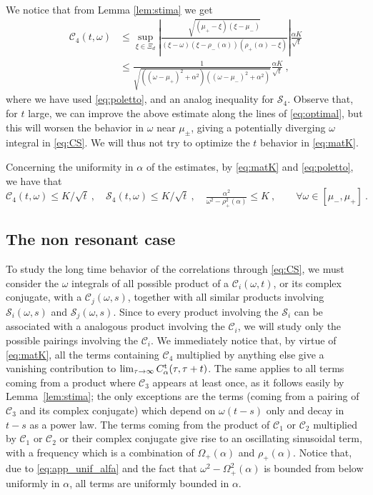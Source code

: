 \documentclass[11pt]{article}
\numberwithin{equation}{section}
\numberwithin{theorem}{section}
\newcommand{\matC}{{\mathscr C}}
\newcommand{\matS}{{\mathscr S}}
\newcommand{\x}{\xi}
\begin{document}
We notice that from Lemma \ref{lem:stima} we get
\begin{equation}\label{eq:matK}
  \begin{split}
\matC_4(t,\omega)&\leq\sup_{\xi\in\Xi_d}\left|\frac{\sqrt{(\mu_+-\xi)(\x-\mu_-)}}
{(\xi-\omega)(\xi-\rho_-(\alpha))(\rho_+(\alpha)-\xi)}\right|\frac{\alpha
  K}{\sqrt{t}}\\
&\leq \frac {1} 
{\sqrt{((\omega-\mu_+)^2+\alpha^2)((\omega-\mu_-)^2+\alpha^2)}}\frac{\alpha
  K}{\sqrt{t}}\ ,
\end{split}
\end{equation}
where we have
used \eqref{eq:poletto}, and an analog inequality for $\matS_4$.  Observe that, for $t$ large, we can improve the above estimate along the lines of
\eqref{eq:optimal}, but this will worsen the behavior in $\omega$ near $\mu_\pm$, giving a potentially diverging $\omega$ integral  
in \eqref{eq:CS}. We will thus not try to optimize the $t$ behavior in \eqref{eq:matK}.

Concerning the uniformity in $\alpha$ of the estimates, by \eqref{eq:matK} and
\eqref{eq:poletto}, we have that
\begin{equation}\label{eq:app_unif_alfa}
\matC_4(t,\omega)\le K/\sqrt{t}\ ,\quad \matS_4(t,\omega)\le K/\sqrt{t}
\ ,\quad  \tfrac{\alpha^2}{\omega^2-\rho_+^2(\alpha)}\le K\ ,\qquad
\forall \omega\in[\mu_-,\mu_+]\ .
\end{equation}

\subsection{The non resonant case}

To study the long time behavior of the correlations through \eqref{eq:CS}, we must consider the $\omega$ integrals of
all possible product of a $\matC_i(\omega,t)$, or its complex conjugate, with a $\matC_j(\omega,s)$, together with all
similar products involving $\matS_i(\omega,s)$ and $\matS_j(\omega,s)$. Since to every product involving the $\matS_i$
can be associated with a analogous product involving the $\matC_i$, we will study only the possible pairings involving
the $\matC_i$. We immediately notice that, by virtue of \eqref{eq:matK}, all the terms containing $\matC_4$ multiplied
by anything else give a vanishing contribution to $\lim_{\tau\to \infty}C_\alpha^{\rm t}(\tau,\tau+t)$. The same applies
to all terms coming from a product where $\matC_3$ appears at least once, as it follows easily by Lemma~\ref{lem:stima};
the only exceptions are the terms (coming from a pairing of $\matC_3$ and its complex conjugate) which depend on
$\omega(t-s)$ only and decay in $t-s$ as a power law. The terms coming from the product of $\matC_1$ or $\matC_2$
multiplied by $\matC_1$ or $\matC_2$ or their complex conjugate give rise to an oscillating sinusoidal term, with a
frequency which is a combination of $\Omega_+(\alpha)$ and $\rho_+(\alpha)$. Notice that, due to
\eqref{eq:app_unif_alfa} and the fact that $\omega^2-\Omega_+^2(\alpha)$ is bounded from below uniformly in $\alpha$,
all terms are uniformly bounded in $\alpha$.
\end{document}
